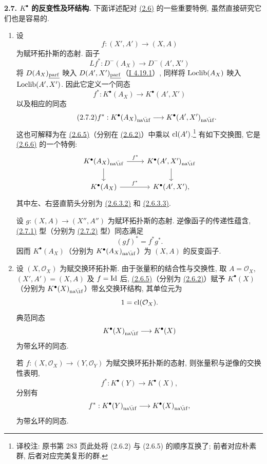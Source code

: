\textbf{2.7. \(K^{\bullet}\) 的反变性及环结构.} 下面详述配对 \hyperlink{sga6.e04.para.2-6}{(2.6)} 的一些重要特例, 虽然直接研究它们也是容易的.
\begin{enumerate}[label=\alph*)]
\item 设
\[
 f:(X',A')\longrightarrow (X,A)
\]
为赋环拓扑斯的态射. 函子
\[
 Lf^*:D^-(A_X)\longrightarrow D^-(A',X')
\]
将 \(D(A_X)_{\underline{\operatorname{parf}}}\) 映入 \(D(A',X')_{\underline{\operatorname{parf}}}\)（\hyperlink{sga6.e01.cor.4-19-1}{I 4.19.1}）, 同样将 \(\operatorname{Loclib}(A_X)\) 映入 \(\operatorname{Loclib}(A',X')\). 因此它定义一个同态
\begin{equation}\tag{2.7.1}
 f^*:K^{\bullet}(A_X)\longrightarrow K^{\bullet}(A',X')
\end{equation}
以及相应的同态
\begin{equation}\tag{2.7.2}
 f^*:K^{\bullet}(A_X)_{\naif}\longrightarrow K^{\bullet}(A',X')_{\naif}.
\end{equation}
这也可解释为在 \hyperlink{sga6.e04.eq.2-6-5}{(2.6.5)}（分别在 \hyperlink{sga6.e04.eq.2-6-2}{(2.6.2)}）中乘以 \(\operatorname{cl}(A')\).\footnote{译校注: 原书第 283 页此处将 (2.6.2) 与 (2.6.5) 的顺序互换了; 前者对应朴素群, 后者对应完美复形的群.} 有如下交换图, 它是 \hyperlink{sga6.e04.eq.2-6-6}{(2.6.6)} 的一个特例:
\[
\begin{tikzcd}
K^{\bullet}(A_X)_{\naif}\arrow[r,"f^*"]\arrow[d]
&K^{\bullet}(A',X')_{\naif}\arrow[d]\\
K^{\bullet}(A_X)\arrow[r,"f^*"]
&K^{\bullet}(A',X'),
\end{tikzcd}
\]
其中左、右竖直箭头分别为 \hyperlink{sga6.e04.eq.2-6-3-2}{(2.6.3.2)} 和 \hyperlink{sga6.e04.eq.2-6-3-3}{(2.6.3.3)}.

设 \(g:(X,A)\to(X'',A'')\) 为赋环拓扑斯的态射. 逆像函子的传递性蕴含, \hyperlink{sga6.e04.eq.2-7-1}{(2.7.1)} 型（分别为 \hyperlink{sga6.e04.eq.2-7-2}{(2.7.2)} 型）同态满足
\begin{equation}\tag{2.7.3}
 (gf)^*=f^*g^*.
\end{equation}
因而 \(K^{\bullet}(A_X)\)（分别为 \(K^{\bullet}(A_X)_{\naif}\)）为 \((X,A)\) 的反变函子.

\item 设 \((X,\mathcal O_X)\) 为赋交换环拓扑斯. 由于张量积的结合性与交换性, 取 \(A=\mathcal O_X\), \((X',A')=(X,A)\) 及 \(f=\operatorname{Id}\) 后, \hyperlink{sga6.e04.eq.2-6-5}{(2.6.5)}（分别为 \hyperlink{sga6.e04.eq.2-6-2}{(2.6.2)}）赋予 \(K^{\bullet}(X)\)（分别为 \(K^{\bullet}(X)_{\naif}\)）带幺交换环结构, 其单位元为
\[
 1=\operatorname{cl}(\mathcal O_X).
\]
典范同态
\[
 K^{\bullet}(X)_{\naif}\longrightarrow K^{\bullet}(X)
\]
为带幺环的同态.

若 \(f:(X,\mathcal O_X)\to(Y,\mathcal O_Y)\) 为赋交换环拓扑斯的态射, 则张量积与逆像的交换性表明,
\[
 f^*:K^{\bullet}(Y)\longrightarrow K^{\bullet}(X),
\]
分别有
\[
 f^*:K^{\bullet}(Y)_{\naif}\longrightarrow K^{\bullet}(X)_{\naif},
\]
为带幺环的同态.
\end{enumerate}

